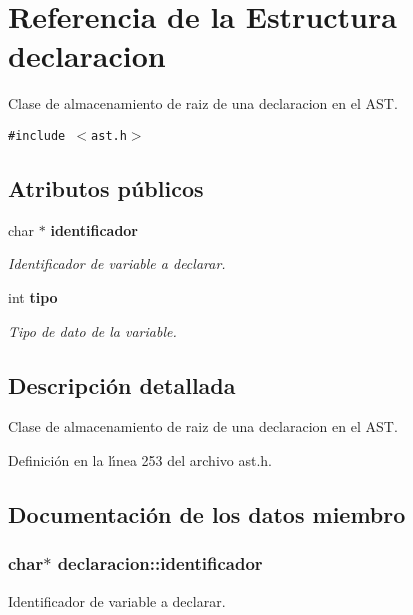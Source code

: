\section{Referencia de la Estructura declaracion}
\label{structdeclaracion}
Clase de almacenamiento de raiz de una declaracion en el AST.  


{\tt \#include $<$ast.h$>$}

\subsection*{Atributos p\'{u}blicos}
\begin{CompactItemize}
\item 
char $\ast$ {\bf identificador}
\begin{CompactList}\small\item\em Identificador de variable a declarar. \item\end{CompactList}\item 
int {\bf tipo}
\begin{CompactList}\small\item\em Tipo de dato de la variable. \item\end{CompactList}\end{CompactItemize}


\subsection{Descripci\'{o}n detallada}
Clase de almacenamiento de raiz de una declaracion en el AST. 



Definici\'{o}n en la l\'{\i}nea 253 del archivo ast.h.

\subsection{Documentaci\'{o}n de los datos miembro}
\subsubsection{\setlength{\rightskip}{0pt plus 5cm}char$\ast$ {\bf declaracion::identificador}}\label{structdeclaracion_o0}


Identificador de variable a declarar. 



